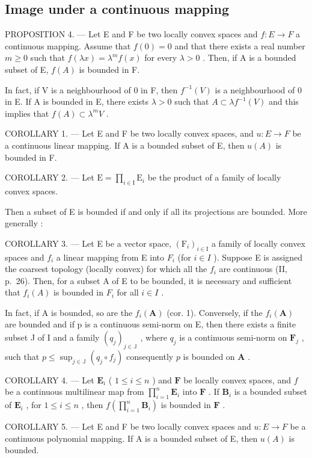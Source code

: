 \subsection{Image under a continuous mapping}

PROPOSITION 4. --- Let E and F be two locally convex spaces and \(f:E \rightarrow F\) a continuous mapping. Assume that \(f(0) = 0\) and that there exists a real number \(m \geqslant 0\) such that \(f(\lambda x) = \lambda^{m}f(x)\) for every \(\lambda > 0\) . Then, if A is a bounded subset of E, \(f(A)\) is bounded in F.

In fact, if V is a neighbourhood of 0 in F, then \(f^{-1}(V)\) is a neighbourhood of 0 in E. If A is bounded in E, there exists \(\lambda > 0\) such that \(A \subset \lambda f^{-1}(V)\) and this implies that \(f(A) \subset \lambda^{m}V\) .

COROLLARY 1. --- Let E and F be two locally convex spaces, and \(u:E\to F\) be a continuous linear mapping. If A is a bounded subset of E, then \(u(A)\) is bounded in F.

COROLLARY 2. --- Let \(\mathrm{E} = \prod_{i\in \mathrm{I}}\mathrm{E}_i\) be the product of a family of locally convex spaces.

Then a subset of E is bounded if and only if all its projections are bounded. More generally :

COROLLARY 3. --- Let E be a vector space, \((\mathrm{F}_{i})_{i\in\mathrm{I}}\) a family of locally convex spaces and \(f_{i}\) a linear mapping from E into \(F_{i}\) (for \(i\in I\) ). Suppose E is assigned the coarsest topology (locally convex) for which all the \(f_{i}\) are continuous (II, p.~26). Then, for a subset A of E to be bounded, it is necessary and sufficient that \(f_{i}(A)\) is bounded in \(F_{i}\) for all \(i\in I\) .

In fact, if A is bounded, so are the \(f_{i}(\mathbf{A})\) (cor. 1). Conversely, if the \(f_{i}(\mathbf{A})\) are bounded and if p is a continuous semi-norm on E, then there exists a finite subset J of I and a family \((q_{j})_{j\in \mathbb{J}}\) , where \(q_{j}\) is a continuous semi-norm on \(\mathbf{F}_j\) , such that \(p\leqslant \sup_{j\in \mathbb{J}}(q_j\circ f_j)\) consequently \(p\) is bounded on \(\mathbf{A}\) .

COROLLARY 4. --- Let \(\mathbf{E}_i\) ( \(1 \leqslant i \leqslant n\) ) and \(\mathbf{F}\) be locally convex spaces, and \(f\) be a continuous multilinear map from \(\prod_{i=1}^{n} \mathbf{E}_i\) into \(\mathbf{F}\) . If \(\mathbf{B}_i\) is a bounded subset of \(\mathbf{E}_i\) , for \(1 \leqslant i \leqslant n\) , then \(f\left(\prod_{i=1}^{n} \mathbf{B}_i\right)\) is bounded in \(\mathbf{F}\) .

COROLLARY 5. --- Let E and F be two locally convex spaces and \(u:E\to F\) be a continuous polynomial mapping. If A is a bounded subset of E, then \(u(A)\) is bounded.

